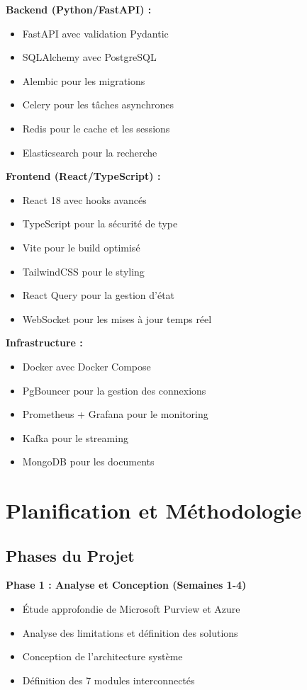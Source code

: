 \documentclass[a4paper,12pt]{article}
\begin{document}
\textbf{Backend (Python/FastAPI) :}
\begin{itemize}
    \item FastAPI avec validation Pydantic
    \item SQLAlchemy avec PostgreSQL
    \item Alembic pour les migrations
    \item Celery pour les tâches asynchrones
    \item Redis pour le cache et les sessions
    \item Elasticsearch pour la recherche
\end{itemize}

\textbf{Frontend (React/TypeScript) :}
\begin{itemize}
    \item React 18 avec hooks avancés
    \item TypeScript pour la sécurité de type
    \item Vite pour le build optimisé
    \item TailwindCSS pour le styling
    \item React Query pour la gestion d'état
    \item WebSocket pour les mises à jour temps réel
\end{itemize}

\textbf{Infrastructure :}
\begin{itemize}
    \item Docker avec Docker Compose
    \item PgBouncer pour la gestion des connexions
    \item Prometheus + Grafana pour le monitoring
    \item Kafka pour le streaming
    \item MongoDB pour les documents
\end{itemize}

\section*{Planification et Méthodologie}

\subsection*{Phases du Projet}

\textbf{Phase 1 : Analyse et Conception (Semaines 1-4)}
\begin{itemize}
    \item Étude approfondie de Microsoft Purview et Azure
    \item Analyse des limitations et définition des solutions
    \item Conception de l'architecture système
    \item Définition des 7 modules interconnectés
\end{itemize}
\end{document}
